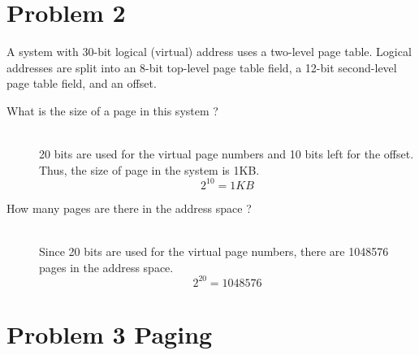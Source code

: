 \documentclass{article}
\begin{document}
\section{Problem 2}
A system with 30-bit logical (virtual) address uses a two-level page table.
Logical addresses are split into an 8-bit top-level page table field, a 12-bit second-level page
table field, and an offset.
\begin{description}
    \item[What is the size of a page in this system ?] \hfill \\
    20 bits are used for the virtual page numbers and 10 bits left for the offset. Thus, the size of page in the system is 1KB.
    \[2^{10} = 1KB\]
    \item[How many pages are there in the address space ?] \hfill \\ 
    Since 20 bits are used for the virtual page numbers, there are 1048576 pages in the address space.
    \[2^{20} = 1048576\]
    
\end{description}

\newpage

\section{Problem 3 Paging}
\end{document}
